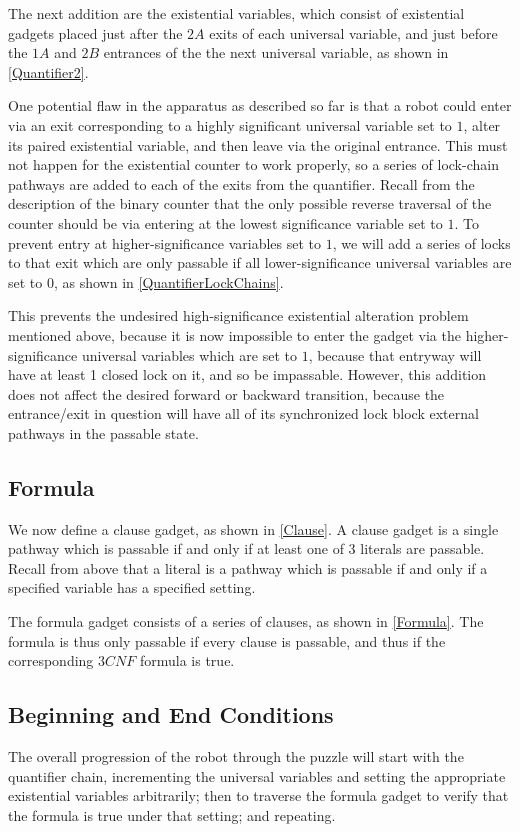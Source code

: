 \documentclass[11pt]{article}
\begin{document}
The next addition are the existential variables, which consist of existential gadgets placed just after the $2A$
exits of each universal variable,
and just before the $1A$ and $2B$ entrances of the the next universal variable, as shown
in \ref{Quantifier2}.

One potential flaw in the apparatus as described so far is that a robot could enter via an exit corresponding
to a highly significant universal variable set to $1$, alter its paired existential variable,
and then leave via the original entrance.
This must not happen for the existential counter to work properly, so a series of lock-chain pathways are added
to each of the exits from the quantifier. Recall from the description of the binary counter that the only
possible reverse traversal of the counter should be via entering at the lowest significance variable set to $1$.
To prevent
entry at higher-significance variables set to $1$, we will add a series of locks to
that exit which are only passable if
all lower-significance universal variables are set to $0$, as shown in \ref{QuantifierLockChains}.

This prevents the undesired high-significance existential alteration problem mentioned above, because
it is now impossible to enter the gadget via the higher-significance universal variables which are set to $1$,
because that entryway will have at least 1 closed lock on it, and so be impassable. However, this addition does
not affect the desired forward or backward transition, because the entrance/exit in question will have
all of its synchronized lock block external pathways in the passable state.

\subsection{Formula}
We now define a clause gadget, as shown in \ref{Clause}. A clause gadget is a single pathway which is passable
if and only if at least one of 3 literals are passable. Recall from above that a literal is a pathway which is
passable if and only if a specified variable has a specified setting.

The formula gadget consists of a series of clauses, as shown in \ref{Formula}. The formula is thus only passable
if every clause is passable, and thus if the corresponding $3CNF$ formula is true.

\subsection{Beginning and End Conditions}
The overall progression of the robot through the puzzle will start with the quantifier chain,
incrementing the universal variables and setting the appropriate existential variables arbitrarily; then to
traverse the formula gadget to verify that the formula is true under that setting; and repeating.
\end{document}
